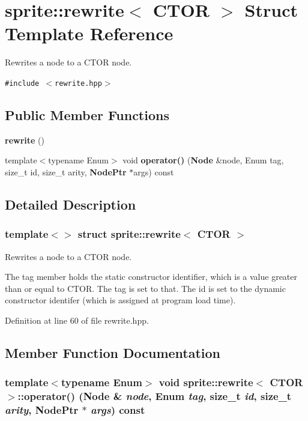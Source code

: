 \section{sprite::rewrite$<$ CTOR $>$ Struct Template Reference}
\label{structsprite_1_1rewrite_3_01CTOR_01_4}
Rewrites a node to a CTOR node.  


{\tt \#include $<$rewrite.hpp$>$}

\subsection*{Public Member Functions}
\begin{CompactItemize}
\item 
{\bf rewrite} ()\label{structsprite_1_1rewrite_3_01CTOR_01_4_a0}

\item 
template$<$typename Enum$>$ void {\bf operator()} ({\bf Node} \&node, Enum tag, size\_\-t id, size\_\-t arity, {\bf Node\-Ptr} $\ast$args) const 
\end{CompactItemize}


\subsection{Detailed Description}
\subsubsection*{template$<$$>$ struct sprite::rewrite$<$ CTOR $>$}

Rewrites a node to a CTOR node. 

The tag member holds the static constructor identifier, which is a value greater than or equal to CTOR. The tag is set to that. The id is set to the dynamic constructor identifer (which is assigned at program load time). 



Definition at line 60 of file rewrite.hpp.

\subsection{Member Function Documentation}
\subsubsection{\setlength{\rightskip}{0pt plus 5cm}template$<$typename Enum$>$ void sprite::rewrite$<$ CTOR $>$::operator() ({\bf Node} \& {\em node}, Enum {\em tag}, size\_\-t {\em id}, size\_\-t {\em arity}, {\bf Node\-Ptr} $\ast$ {\em args}) const\hspace{0.3cm}{\tt  [inline]}}\label{structsprite_1_1rewrite_3_01CTOR_01_4_a1}


